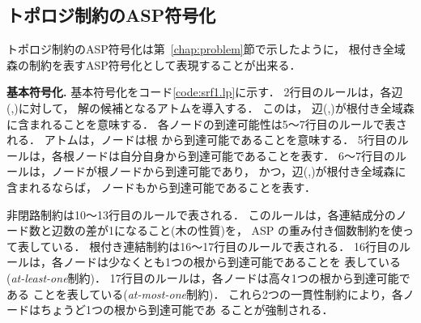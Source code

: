 \subsection{トポロジ制約のASP符号化}\label{chap:topology}





トポロジ制約のASP符号化は第~\ref{chap:problem}節で示したように，
根付き全域森の制約を表すASP符号化として表現することが出来る．

\textbf{基本符号化.}
基本符号化をコード\ref{code:srf1.lp}に示す．
2行目のルールは，各辺(,)に対して，
解の候補となるアトムを導入する．
このは，
辺(,)が根付き全域森に含まれることを意味する．
%
各ノードの到達可能性は5～7行目のルールで表される．
アトムは，ノードは根
から到達可能であることを意味する．
5行目のルールは，各根ノードは自分自身から到達可能であることを表す．
6～7行目のルールは，ノードが根ノードから到達可能であり，
かつ，辺(,)が根付き全域森に含まれるならば，
ノードもから到達可能であることを表す．

非閉路制約は10～13行目のルールで表される．
このルールは，各連結成分のノード数と辺数の差が1になること(木の性質)を，
ASP の重み付き個数制約を使って表している．
%
根付き連結制約は16～17行目のルールで表される．
16行目のルールは，各ノードは少なくとも1つの根から到達可能であることを
表している(\textit{at-least-one}制約)．
17行目のルールは，各ノードは高々1つの根から到達可能である
ことを表している(\textit{at-most-one}制約)．
これら2つの一貫性制約により，各ノードはちょうど1つの根から到達可能であ
ることが強制される．

